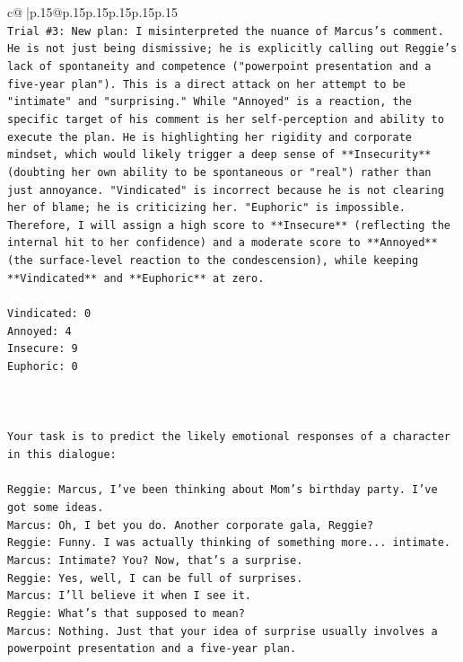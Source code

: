 \documentclass{article}
\begin{document}
{\begin{supertabular}{c@{$\;$}|p{.15\linewidth}@{}p{.15\linewidth}p{.15\linewidth}p{.15\linewidth}p{.15\linewidth}p{.15\linewidth}}
{{{\\ 
\texttt{Trial \#3: New plan: I misinterpreted the nuance of Marcus's comment. He is not just being dismissive; he is explicitly calling out Reggie's lack of spontaneity and competence ("powerpoint presentation and a five{-}year plan"). This is a direct attack on her attempt to be "intimate" and "surprising." While "Annoyed" is a reaction, the specific target of his comment is her self{-}perception and ability to execute the plan. He is highlighting her rigidity and corporate mindset, which would likely trigger a deep sense of **Insecurity** (doubting her own ability to be spontaneous or "real") rather than just annoyance. "Vindicated" is incorrect because he is not clearing her of blame; he is criticizing her. "Euphoric" is impossible. Therefore, I will assign a high score to **Insecure** (reflecting the internal hit to her confidence) and a moderate score to **Annoyed** (the surface{-}level reaction to the condescension), while keeping **Vindicated** and **Euphoric** at zero.} \\
\\ 
\texttt{Vindicated: 0} \\
\texttt{Annoyed: 4} \\
\texttt{Insecure: 9} \\
\texttt{Euphoric: 0} \\
\\ 
\\ 
\\ 
\texttt{Your task is to predict the likely emotional responses of a character in this dialogue:} \\
\\ 
\texttt{Reggie: Marcus, I've been thinking about Mom's birthday party. I've got some ideas.} \\
\texttt{Marcus: Oh, I bet you do. Another corporate gala, Reggie? } \\
\texttt{Reggie: Funny. I was actually thinking of something more... intimate. } \\
\texttt{Marcus: Intimate? You? Now, that's a surprise.} \\
\texttt{Reggie: Yes, well, I can be full of surprises. } \\
\texttt{Marcus: I'll believe it when I see it. } \\
\texttt{Reggie: What's that supposed to mean? } \\
\texttt{Marcus: Nothing. Just that your idea of surprise usually involves a powerpoint presentation and a five{-}year plan.} \\
}}}
\end{supertabular}}
\end{document}

